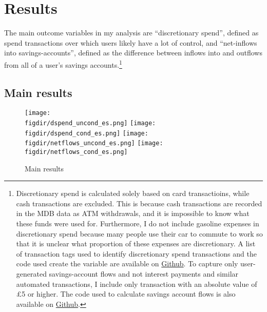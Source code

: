 \section{Results}%
\label{sec:results}

The main outcome variables in my analysis are ``discretionary spend'', defined
as spend transactions over which users likely have a lot of control, and
``net-inflows into savings-accounts'', defined as the difference between
inflows into and outflows from all of a user's savings
accounts.\footnote{Discretionary spend is calculated solely based on card
    transactioins, while cash transactions are excluded. This is because cash
    transactions are recorded in the MDB data as ATM withdrawals, and it is
    impossible to know what these funds were used for. Furthermore, I do
    not include gasoline expenses in discretionary spend because many people
    use their car to commute to work so that it is unclear what proportion of
    these expenses are discretionary. A list of transaction tags used to
    identify discretionary spend transactions and the code used create the
    variable are available on
    \href{https://github.com/fabiangunzinger/mdb_eval/blob/f31bfcd7a330188cdd27968d41957ebf5b454099/src/data/aggregators.py\#L389}{Github}.
    To capture only user-generated savings-account flows and not interest
    payments and similar automated transactions, I include only transaction
with an absolute value of \pounds5 or higher. The code used to calculate
savings account flows is also available on
\href{https://github.com/fabiangunzinger/mdb_eval/blobf31bfcd7a330188cdd27968d41957ebf5b454099/src/data/aggregators.py\#L89}{Github}.}


\subsection{Main results}%
\label{sub:main_results}

\begin{figure}[h]
    \centering 
    \caption{Main results}
    \label{fig:main_results}
    \texttt{[image: \\figdir/dspend\_uncond\_es.png]}
    \texttt{[image: \\figdir/dspend\_cond\_es.png]}
    \texttt{[image: \\figdir/netflows\_uncond\_es.png]}
    \texttt{[image: \\figdir/netflows\_cond\_es.png]}
\end{figure}

